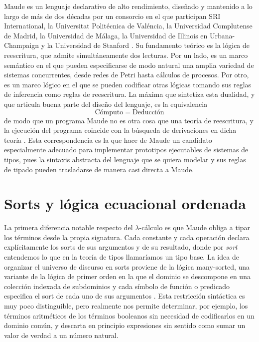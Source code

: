Maude es un lenguaje declarativo de alto rendimiento, diseñado y mantenido a lo largo de más de dos décadas por un consorcio en el que participan SRI International, la Universitat Politécnica de Valéncia, la Universidad Complutense de Madrid, la Universidad de Málaga, la Universidad de Illinois en Urbana-Champaign y la Universidad de Stanford \citep{duran2019, clavel2007}. Su fundamento teórico es la lógica de reescritura, que admite simultáneamente dos lecturas. Por un lado, es un marco semántico en el que pueden especificarse de modo natural una amplia variedad de sistemas concurrentes, desde redes de Petri hasta cálculos de procesos. Por otro, es un marco lógico en el que se pueden codificar otras lógicas tomando sus reglas de inferencia como reglas de reescritura. La máxima que sintetiza esta dualidad, y que articula buena parte del diseño del lenguaje, es la equivalencia
\[
\text{C\'omputo} \;=\; \text{Deducci\'on}
\]
de modo que un programa Maude no es otra cosa que una teoría de reescritura, y la ejecución del programa coincide con la búsqueda de derivaciones en dicha teoría \citep{clavel2007}. Esta correspondencia es la que hace de Maude un candidato especialmente adecuado para implementar prototipos ejecutables de sistemas de tipos, pues la sintaxis abstracta del lenguaje que se quiera modelar y sus reglas de tipado pueden trasladarse de manera casi directa a Maude.

\section{Sorts y lógica ecuacional ordenada}
La primera diferencia notable respecto del $\lambda$-cálculo es que Maude obliga a tipar los términos desde la propia signatura. Cada constante y cada operación declara explícitamente los sorts de sus argumentos y de su resultado, donde por \textit{sort} entendemos lo que en la teoría de tipos llamaríamos un tipo base. La idea de organizar el universo de discurso en sorts proviene de la lógica many-sorted, una variante de la lógica de primer orden en la que el dominio se descompone en una colección indexada de subdominios y cada símbolo de función o predicado especifica el sort de cada uno de sus argumentos \citep{sep-logic-many-sorted}. Esta restricción sintáctica es muy poco distinguible, pero realmente nos permite determinar, por ejemplo, los términos aritméticos de los términos booleanos sin necesidad de codificarlos en un dominio común, y descarta en principio expresiones sin sentido como sumar un valor de verdad a un número natural.

